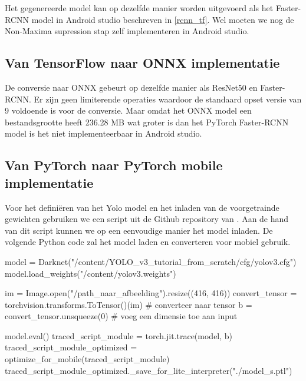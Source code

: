 Het gegenereerde model kan op dezelfde manier worden uitgevoerd als het Faster-RCNN model in Android studio beschreven in \ref{rcnn_tf}.
Wel moeten we nog de Non-Maxima supression stap zelf implementeren in Android studio.

\subsection{Van TensorFlow naar ONNX implementatie}
De conversie naar ONNX gebeurt op dezelfde manier als ResNet50 en Faster-RCNN.
Er zijn geen limiterende operaties waardoor de standaard opset versie van 9 voldoende is voor de conversie.
Maar omdat het ONNX model een bestandsgrootte heeft 236.28 MB wat groter is dan het PyTorch Faster-RCNN model is het niet implementeerbaar in Android studio.

\subsection{Van PyTorch naar PyTorch mobile implementatie}
Voor het defini\"eren van het Yolo model en het inladen van de voorgetrainde gewichten gebruiken we een script uit de Github repository van \cite{kathuria_pytorch_2022} .
Aan de hand van dit script kunnen we op een eenvoudige manier het model inladen.
De volgende Python code zal het model laden en converteren voor mobiel gebruik.
\newpage
\begin{python}
model = Darknet("/content/YOLO_v3_tutorial_from_scratch/cfg/yolov3.cfg")
model.load_weights("/content/yolov3.weights")

im = Image.open("/path_naar_afbeelding").resize((416, 416))
convert_tensor = torchvision.transforms.ToTensor()(im) # converteer naar tensor
b = convert_tensor.unsqueeze(0) # voeg een dimensie toe aan input

model.eval()
traced_script_module = torch.jit.trace(model, b)
traced_script_module_optimized = optimize_for_mobile(traced_script_module)
traced_script_module_optimized._save_for_lite_interpreter("./model_s.ptl")
\end{python}

